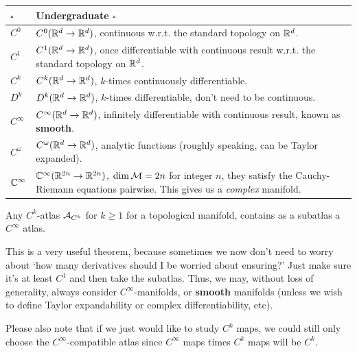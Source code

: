 \documentclass[12pt]{article} %
\begin{document}
\begin{center}
	\begin{tabular}{@{} p{2cm}p{10cm}@{}}
		\toprule
		$\square$ & Undergraduate $\square$ \\
		\midrule 
		$C^0$ & $C^0(\mathbb{R}^d\to\mathbb{R}^d)$, continuous w.r.t. the standard topology on $\mathbb{R}^d$. \\
		$C^1$ & $C^1(\mathbb{R}^d\to\mathbb{R}^d)$, once differentiable with continuous result w.r.t. the standard topology on $\mathbb{R}^d$. \\
		$C^k$ & $C^k(\mathbb{R}^d\to\mathbb{R}^d)$, $k$-times continuously differentiable. \\
		$D^k$ & $D^k(\mathbb{R}^d\to\mathbb{R}^d)$, $k$-times  differentiable, don't need to be continuous. \\
		$C^{\infty}$ & $C^{\infty}(\mathbb{R}^d\to\mathbb{R}^d)$, infinitely differentiable with continuous result, known as \textbf{smooth}. \\
		$C^{\omega}$ & $C^{\omega}(\mathbb{R}^d\to\mathbb{R}^d)$, analytic functions (roughly speaking, can be Taylor expanded). \\
		$\mathbb{C}^{\infty}$ & $\mathbb{C}^{\infty}(\mathbb{R}^{2n}\to\mathbb{R}^{2n})$, $\operatorname{dim} \mathcal{M} = 2n$ for integer $n$, they satisfy the Cauchy-Riemann equations pairwise. This gives us a \textit{complex} manifold. \\
		\bottomrule
	\end{tabular}
\end{center}

    Any $C^k$-atlas $\mathcal{A}_{C^k}$ for $k\geq 1$ for a topological manifold, contains as a subatlas a $C^{\infty}$ atlas. 
\et 
\begin{rema}
This is a very useful theorem, because sometimes we now don't need to worry about `how many derivatives should I be worried about ensuring?' Just make sure it's at least $C^1$ and then take the subatlas. Thus, we may, without loss of generality, always consider $C^{\infty}$-manifolds, or \textbf{smooth} manifolds (unless we wish to define Taylor expandability or complex differentiability, etc).
\end{rema}
\begin{rema}
Please also note that if we just would like to study $C^k$ maps, we could still only choose the $C^{\infty}$-compatible atlas since $C^\infty$ maps times $C^k$ maps will be $C^k$. 
\end{rema}
\end{document}
